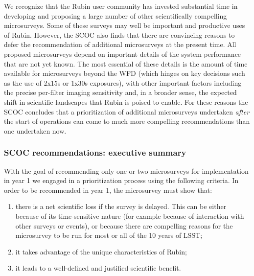 We recognize that the Rubin user community has invested substantial time in developing and proposing a large number of other scientifically compelling microsurveys. Some of these surveys may well be important and productive uses of Rubin.
 However, the SCOC also finds that there are convincing reasons to defer the recommendation of additional microsurveys at the present time. All proposed microsurveys depend on important details of the system performance that are not yet known. The most essential of these details is the amount of time available for microsurveys beyond the WFD (which hinges on key decisions such as the use of 2x15s or 1x30s exposures), with other important factors including the precise per-filter imaging sensitivity and, in a broader sense, the expected shift in scientific landscapes that Rubin is poised to enable. For these reasons the SCOC concludes that a prioritization of additional microsurveys undertaken \emph{after} the start of operations can come to much more compelling recommendations than one undertaken now.




\subsubsection{SCOC recommendations: executive summary}\label{rec:microsurvey_ec}

With the goal of recommending only one or two microsurveys for implementation in year 1 we engaged in a prioritization process using the following criteria. In order to be recommended in year 1, the microsurvey must show that:

\begin{enumerate}[label=(\roman*)]
    \item there is a net scientific loss if the survey is delayed. This can be either because of its time-sensitive nature (for example because of interaction with other surveys or events), or because there are compelling reasons for the microsurvey to be run for most or all of the 10 years of LSST;
    \item it takes advantage of the unique characteristics of Rubin;
    \item it leads to a well-defined and justified scientific benefit.
\end{enumerate}


